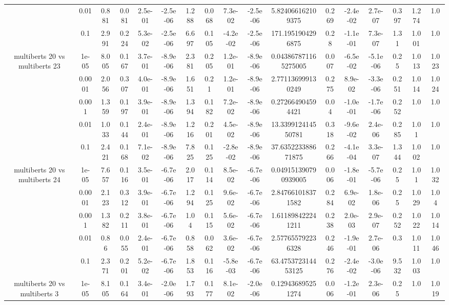 \begin{tabular}{|c|c|c|c|c|c|c|c|c|c|c|c|c|c|c|c|c|}
 & 0.01 & 0.881 & 0.081 & 2.5e-01 & -2.5e-06 & 1.288 & 0.068 & 7.3e-02 & -2.5e-06 & 5.824066162109375 & 0.269 & -2.4e-02 & 2.7e-07 & 0.397 & 1.274 & 1.0 \\
 & 0.1 & 2.991 & 0.224 & 5.3e-02 & -2.5e-06 & 6.697 & 0.105 & -4.2e-02 & -2.5e-06 & 171.1951904296875 & 0.28 & -1.1e-01 & 7.3e-07 & 1.31 & 1.001 & 1.0 \\
\hline
\multirow{5}{*}{multiberts 20 vs multiberts 23} & 1e-05 & 8.005 & 0.167 & 3.7e-01 & -8.9e-06 & 2.381 & 0.205 & 1.2e-01 & -8.9e-06 & 0.043867871165275005 & 0.007 & -6.5e-02 & -5.1e-06 & 0.25 & 1.013 & 1.023 \\
 & 0.0001 & 2.056 & 0.307 & 4.0e-01 & -8.9e-06 & 1.651 & 0.21 & 1.2e-01 & -8.9e-06 & 2.771136999130249 & 0.275 & 8.9e-02 & -3.3e-06 & 0.251 & 1.014 & 1.024 \\
 & 0.001 & 1.359 & 0.197 & 3.9e-01 & -8.9e-06 & 1.394 & 0.182 & 7.2e-02 & -8.9e-06 & 0.272664904594421 & 0.04 & -1.0e-01 & -1.7e-06 & 0.252 & 1.0 & 1.0 \\
 & 0.01 & 1.033 & 0.144 & 2.4e-01 & -8.9e-06 & 1.216 & 0.201 & 4.5e-02 & -8.9e-06 & 13.339912414550781 & 0.318 & -9.6e-02 & 2.4e-06 & 0.285 & 1.01 & 1.0 \\
 & 0.1 & 2.421 & 0.168 & 7.1e-02 & -8.9e-06 & 7.825 & 0.125 & -2.8e-02 & -8.9e-06 & 37.635223388671875 & 0.266 & -4.1e-04 & 3.3e-07 & 1.344 & 1.002 & 1.0 \\
\hline
\multirow{5}{*}{multiberts 20 vs multiberts 24} & 1e-05 & 7.657 & 0.116 & 3.5e-01 & -6.7e-06 & 2.017 & 0.114 & 8.5e-02 & -6.7e-06 & 0.049151390790939005 & 0.006 & -1.8e-01 & -5.7e-06 & 0.25 & 1.01 & 1.032 \\
 & 0.0001 & 2.123 & 0.312 & 3.9e-01 & -6.7e-06 & 1.294 & 0.125 & 9.6e-02 & -6.7e-06 & 2.847661018371582 & 0.284 & 6.9e-02 & 1.8e-06 & 0.25 & 1.029 & 1.04 \\
 & 0.001 & 1.382 & 0.211 & 3.8e-01 & -6.7e-06 & 1.04 & 0.115 & 5.6e-02 & -6.7e-06 & 1.611898422241211 & 0.238 & 2.0e-03 & 2.9e-07 & 0.252 & 1.022 & 1.014 \\
 & 0.01 & 0.86 & 0.055 & 2.4e-01 & -6.7e-06 & 0.858 & 0.062 & 3.6e-02 & -6.7e-06 & 2.577655792236328 & 0.246 & -1.9e-01 & 2.7e-06 & 0.3 & 1.011 & 1.046 \\
 & 0.1 & 2.371 & 0.201 & 5.2e-02 & -6.7e-06 & 1.853 & 0.116 & -5.8e-03 & -6.7e-06 & 63.475372314453125 & 0.276 & -2.4e-02 & -3.0e-06 & 9.532 & 1.003 & 1.0 \\
\hline
\multirow{5}{*}{multiberts 20 vs multiberts 3} & 1e-05 & 8.105 & 0.164 & 3.4e-01 & -2.0e-06 & 1.793 & 0.177 & 8.1e-02 & -2.0e-06 & 0.129436895251274 & 0.006 & -1.2e-01 & 2.3e-06 & 0.25 & 1.0 & 1.019 \\

\end{tabular}
